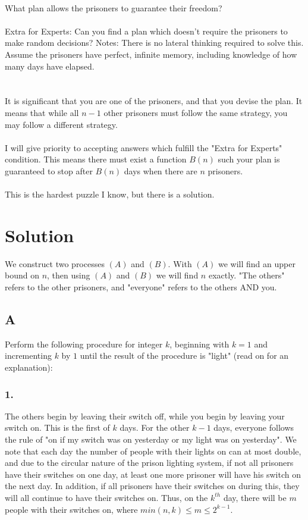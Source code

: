 \documentclass[11pt]{article}
\begin{document}
\\
What plan allows the prisoners to guarantee their freedom?\\
\\
Extra for Experts: Can you find a plan which doesn't require the prisoners to make random decisions?
Notes: There is no lateral thinking required to solve this. Assume the prisoners have perfect, infinite memory, including knowledge of how many days have elapsed.\\
\\
\\
It is significant that you are one of the prisoners, and that you devise the plan. It means that while all $n-1$ other prisoners must follow the same strategy, you may follow a different strategy.\\
\\
I will give priority to accepting answers which fulfill the "Extra for Experts" condition. This means there must exist a function $B(n)$ such your plan is guaranteed to stop after $B(n)$ days when there are $n$ prisoners.\\
\\
This is the hardest puzzle I know, but there is a solution.



\section*{Solution}
We construct two processes $(A)$ and $(B)$. With $(A)$ we will find an upper bound on $n$, then using $(A)$ and $(B)$ we will find $n$ exactly. "The others" refers to the other prisoners, and "everyone" refers to the others AND you.

\subsection*{A}
Perform the following procedure for integer $k$, beginning with $k=1$ and incrementing $k$ by $1$ until the result of the procedure is "light" (read on for an explanation):

\subsubsection*{1.} The others begin by leaving their switch off, while you begin by leaving your switch on. This is the first of $k$ days. For the other $k-1$ days, everyone follows the rule of "on if my switch was on yesterday or my light was on yesterday". We note that each day the number of people with their lights on can at most double, and due to the circular nature of the prison lighting system, if not all prisoners have their switches on one day, at least one more prisoner will have his switch on the next day. In addition, if all prisoners have their switches on during this, they will all continue to have their switches on. Thus, on the $k^{th}$ day, there will be $m$ people with their switches on, where $min(n,k) \leq m \leq 2^{k-1}$.\\
\\
\end{document}

